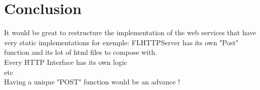 \documentclass[a4paper]{article}
\begin{document}
\section{Conclusion}

It would be great to restructure the implementation of the web services that have very static implementations for exemple:
FLHTTPServer has its own "Post" function and its lot of html files to compose with. \\
Every HTTP Interface has its own logic \\
etc \\

Having a unique "POST" function would be an advance !
\end{document}
